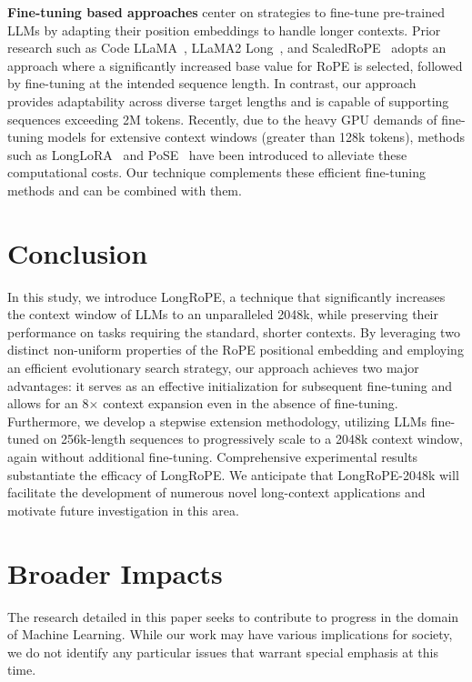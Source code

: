 \textbf{Fine-tuning based approaches} center on strategies to fine-tune pre-trained LLMs by adapting their position embeddings to handle longer contexts. Prior research such as Code LLaMA~\cite{codellama}, LLaMA2 Long~\cite{xiong2023effective}, and ScaledRoPE~\cite{liu2023scaling} adopts an approach where a significantly increased base value for RoPE is selected, followed by fine-tuning at the intended sequence length. In contrast, our approach provides adaptability across diverse target lengths and is capable of supporting sequences exceeding 2M tokens. Recently, due to the heavy GPU demands of fine-tuning models for extensive context windows (greater than 128k tokens), methods such as LongLoRA~\cite{longlora} and PoSE~\cite{zhu2023pose} have been introduced to alleviate these computational costs. Our technique complements these efficient fine-tuning methods and can be combined with them.

\section{Conclusion}

In this study, we introduce LongRoPE, a technique that significantly increases the context window of LLMs to an unparalleled 2048k, while preserving their performance on tasks requiring the standard, shorter contexts. By leveraging two distinct non-uniform properties of the RoPE positional embedding and employing an efficient evolutionary search strategy, our approach achieves two major advantages: it serves as an effective initialization for subsequent fine-tuning and allows for an 8$\times$ context expansion even in the absence of fine-tuning. Furthermore, we develop a stepwise extension methodology, utilizing LLMs fine-tuned on 256k-length sequences to progressively scale to a 2048k context window, again without additional fine-tuning. Comprehensive experimental results substantiate the efficacy of LongRoPE. We anticipate that LongRoPE-2048k will facilitate the development of numerous novel long-context applications and motivate future investigation in this area.

\section*{Broader Impacts} The research detailed in this paper seeks to contribute to progress in the domain of Machine Learning. While our work may have various implications for society, we do not identify any particular issues that warrant special emphasis at this time.

	\balance

